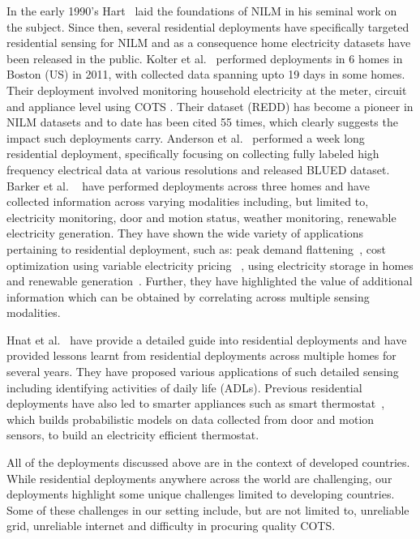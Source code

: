 \documentclass[10pt]{sensys-proc}
\begin{document}
In the early 1990’s Hart~\cite{hart} laid the foundations of NILM in his seminal work on the subject. Since then, several residential deployments have specifically targeted residential sensing for NILM and as a consequence home electricity datasets have been released in the public. Kolter et al.~\cite{redd} performed deployments in 6 homes in Boston (US) in 2011, with collected data spanning upto 19 days in some homes. Their deployment involved monitoring household electricity at the meter, circuit and appliance level using COTS . Their dataset (REDD) has become a pioneer in NILM datasets and to date has been cited 55 times, which clearly suggests the impact such deployments carry. Anderson et al.~\cite{blued_cmu} performed a week long residential deployment, specifically focusing on collecting fully labeled high frequency electrical data at various resolutions and released BLUED dataset. 
Barker et al. ~\cite{smart} have performed deployments across three homes and have collected information across varying modalities including, but limited to, electricity monitoring, door and motion status, weather monitoring, renewable electricity generation. They have shown the wide variety of applications pertaining to residential deployment, such as: peak demand flattening~\cite{smartcap}, cost optimization using variable electricity pricing~\cite{smartcharge} , using electricity storage in homes and renewable generation~\cite{cloudy}. Further, they have highlighted the value of additional information which can be obtained by correlating across multiple sensing modalities.

Hnat et al.~\cite{hitchhiker_residential} have provide a detailed guide into residential deployments and have provided lessons learnt from residential deployments across multiple homes for several years. They have proposed various applications of such detailed sensing including identifying activities of daily life (ADLs). Previous residential deployments have also led to smarter appliances such as smart thermostat~\cite{smart_thermostat}, which builds probabilistic models on data collected from door and motion sensors, to build an electricity efficient thermostat.

All of the deployments discussed above are in the context of developed countries. While residential deployments anywhere across the world are challenging, our deployments highlight some unique challenges limited to developing countries. Some of these challenges in our setting include, but are not limited to, unreliable grid, unreliable internet and difficulty in procuring quality COTS.
\end{document}
